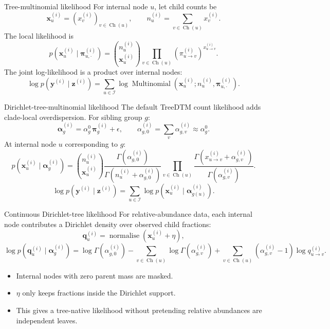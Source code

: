 \documentclass[aspectratio=169,10pt]{beamer}
\newcommand{\I}{\mathcal I}
\newcommand{\Ch}{\operatorname{Ch}}
\begin{document}
\begin{frame}{Tree-multinomial likelihood}
\small
For internal node \(u\), let child counts be
\[
\bm x_u^{(i)}=(x_v^{(i)})_{v\in\Ch(u)},\qquad
n_u^{(i)}=\sum_{v\in\Ch(u)}x_v^{(i)}.
\]
The local likelihood is
\[
p(\bm x_u^{(i)}\mid \bm\pi_{u,\cdot}^{(i)})
=
\binom{n_u^{(i)}}{\bm x_u^{(i)}}
\prod_{v\in\Ch(u)}
\left(\pi_{u\to v}^{(i)}\right)^{x_{u\to v}^{(i)}}.
\]
The joint log-likelihood is a product over internal nodes:
\[
\log p(\bm y^{(i)}\mid\bm z^{(i)})
=
\sum_{u\in\I}
\log\operatorname{Multinomial}
\left(\bm x_u^{(i)};n_u^{(i)},\bm\pi_{u,\cdot}^{(i)}\right).
\]
\end{frame}

\begin{frame}{Dirichlet-tree-multinomial likelihood}
\small
The default TreeDTM count likelihood adds clade-local overdispersion. For sibling group \(g\):
\[
\bm\alpha_g^{(i)}
=\alpha_g^0\,\bm\pi_g^{(i)}+\epsilon,
\qquad
\alpha_{g,0}^{(i)}=\sum_v\alpha_{g,v}^{(i)}\approx \alpha_g^0.
\]
At internal node \(u\) corresponding to \(g\):
\[
p(\bm x_u^{(i)}\mid \bm\alpha_g^{(i)})
=
\binom{n_u^{(i)}}{\bm x_u^{(i)}}
\frac{\Gamma(\alpha_{g,0}^{(i)})}
{\Gamma(n_u^{(i)}+\alpha_{g,0}^{(i)})}
\prod_{v\in\Ch(u)}
\frac{\Gamma(x_{u\to v}^{(i)}+\alpha_{g,v}^{(i)})}
{\Gamma(\alpha_{g,v}^{(i)})}.
\]
\[
\log p(\bm y^{(i)}\mid\bm z^{(i)})
=\sum_{u\in\I}\log p(\bm x_u^{(i)}\mid \bm\alpha_{g(u)}^{(i)}).
\]
\end{frame}

\begin{frame}{Continuous Dirichlet-tree likelihood}
\small
For relative-abundance data, each internal node contributes a Dirichlet density over observed child fractions:
\[
\bm q_u^{(i)}
=\operatorname{normalise}(\bm x_u^{(i)}+\eta),
\]
\[
\log p(\bm q_u^{(i)}\mid\bm\alpha_g^{(i)})
=
\log\Gamma(\alpha_{g,0}^{(i)})
-\sum_{v\in\Ch(u)}\log\Gamma(\alpha_{g,v}^{(i)})
+\sum_{v\in\Ch(u)}
(\alpha_{g,v}^{(i)}-1)\log q_{u\to v}^{(i)}.
\]
\begin{itemize}
  \item Internal nodes with zero parent mass are masked.
  \item \(\eta\) only keeps fractions inside the Dirichlet support.
  \item This gives a tree-native likelihood without pretending relative abundances are independent leaves.
\end{itemize}
\end{frame}
\end{document}
